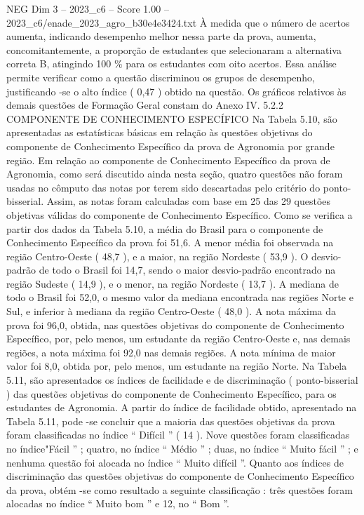 \begin{textsample}{NEG Dim 3 – 2023\_c6 – Score 1.00 – 2023\_c6/enade\_2023\_agro\_b30e4e3424.txt}
À medida que o número de acertos aumenta, indicando desempenho melhor nessa parte da prova, aumenta, concomitantemente, a proporção de estudantes que selecionaram a alternativa correta B, atingindo 100 \% para os estudantes com oito acertos.
Essa análise permite verificar como a questão discriminou os grupos de desempenho, justificando -se o alto índice ( 0,47 ) obtido na questão.
Os gráficos relativos às demais questões de Formação Geral constam do Anexo IV. 5.2.2 COMPONENTE DE CONHECIMENTO ESPECÍFICO Na Tabela 5.10, são apresentadas as estatísticas básicas em relação às questões objetivas do componente de Conhecimento Específico da prova de Agronomia por grande região.
Em relação ao componente de Conhecimento Específico da prova de Agronomia, como será discutido ainda nesta seção, quatro questões não foram usadas no cômputo das notas por terem sido descartadas pelo critério do ponto-bisserial.
Assim, as notas foram calculadas com base em 25 das 29 questões objetivas válidas do componente de Conhecimento Específico.
Como se verifica a partir dos dados da Tabela 5.10, a média do Brasil para o componente de Conhecimento Específico da prova foi 51,6.
A menor média foi observada na região Centro-Oeste ( 48,7 ), e a maior, na região Nordeste ( 53,9 ).
O desvio-padrão de todo o Brasil foi 14,7, sendo o maior desvio-padrão encontrado na região Sudeste ( 14,9 ), e o menor, na região Nordeste ( 13,7 ).
A mediana de todo o Brasil foi 52,0, o mesmo valor da mediana encontrada nas regiões Norte e Sul, e inferior à mediana da região Centro-Oeste ( 48,0 ).
A nota máxima da prova foi 96,0, obtida, nas questões objetivas do componente de Conhecimento Específico, por, pelo menos, um estudante da região Centro-Oeste e, nas demais regiões, a nota máxima foi 92,0 nas demais regiões.
A nota mínima de maior valor foi 8,0, obtida por, pelo menos, um estudante na região Norte.
Na Tabela 5.11, são apresentados os índices de facilidade e de discriminação ( ponto-bisserial ) das questões objetivas do componente de Conhecimento Específico, para os estudantes de Agronomia.
A partir do índice de facilidade obtido, apresentado na Tabela 5.11, pode -se concluir que a maioria das questões objetivas da prova foram classificadas no índice “ Difícil ” ( 14 ).
Nove questões foram classificadas no índice"Fácil ” ; quatro, no índice “ Médio ” ; duas, no índice “ Muito fácil ” ; e nenhuma questão foi alocada no índice “ Muito difícil ”.
Quanto aos índices de discriminação das questões objetivas do componente de Conhecimento Específico da prova, obtém -se como resultado a seguinte classificação : três questões foram alocadas no índice “ Muito bom ” e 12, no “ Bom ”.

\end{textsample}
